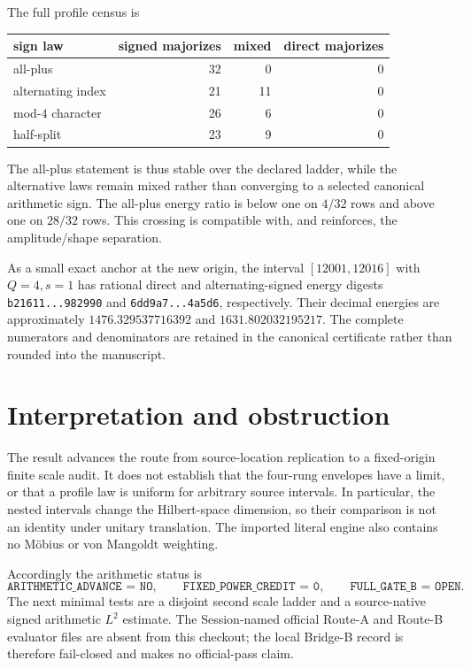 \documentclass[10pt]{article}
\begin{document}
The full profile census is
\begin{center}
\small
\begin{tabular}{lrrr}
\toprule
sign law & signed majorizes & mixed & direct majorizes\\
\midrule
all-plus & 32 & 0 & 0\\
alternating index & 21 & 11 & 0\\
mod-$4$ character & 26 & 6 & 0\\
half-split & 23 & 9 & 0\\
\bottomrule
\end{tabular}
\end{center}
The all-plus statement is thus stable over the declared ladder, while the
alternative laws remain mixed rather than converging to a selected canonical
arithmetic sign.  The all-plus energy ratio is below one on $4/32$ rows and
above one on $28/32$ rows.  This crossing is compatible with, and reinforces,
the amplitude/shape separation.

As a small exact anchor at the new origin, the interval $[12001,12016]$ with
$Q=4,s=1$ has rational direct and alternating-signed energy digests
\texttt{b21611...982990} and \texttt{6dd9a7...4a5d6}, respectively.  Their
decimal energies are approximately $1476.329537716392$ and
$1631.802032195217$.  The complete numerators and denominators are retained
in the canonical certificate rather than rounded into the manuscript.

\section{Interpretation and obstruction}

The result advances the route from source-location replication to a
fixed-origin finite scale audit.  It does not establish that the four-rung
envelopes have a limit, or that a profile law is uniform for arbitrary source
intervals.  In particular, the nested intervals change the Hilbert-space
dimension, so their comparison is not an identity under unitary translation.
The imported literal engine also contains no Möbius or von Mangoldt weighting.

Accordingly the arithmetic status is
\begin{equation*}
\texttt{ARITHMETIC\_ADVANCE = NO},\qquad
\texttt{FIXED\_POWER\_CREDIT = 0},\qquad
\texttt{FULL\_GATE\_B = OPEN}.
\end{equation*}
The next minimal tests are a disjoint second scale ladder and a source-native
signed arithmetic $L^2$ estimate.  The Session-named official Route-A and
Route-B evaluator files are absent from this checkout; the local Bridge-B
record is therefore fail-closed and makes no official-pass claim.
\end{document}
